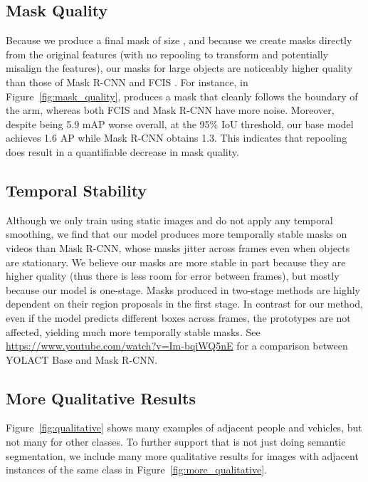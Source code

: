 \documentclass[10pt,journal,compsoc]{IEEEtran}
\begin{document}
\subsection{Mask Quality} Because we produce a final mask of size , and because we create masks directly from the original features (with no repooling to transform and potentially misalign the features), our masks for large objects are noticeably higher quality than those of Mask R-CNN \cite{maskrcnn} and FCIS \cite{fcis}. For instance, in Figure~\ref{fig:mask_quality}, \methodname{} produces a mask that cleanly follows the boundary of the arm, whereas both FCIS and Mask R-CNN have more noise. Moreover, despite being 5.9 mAP worse overall, at the 95\% IoU threshold, our base model achieves 1.6 AP while Mask R-CNN obtains 1.3. This indicates that repooling does result in a quantifiable decrease in mask quality.




\subsection{Temporal Stability}
Although we only train using static images and do not apply any temporal smoothing, we find that our model produces more temporally stable masks on videos than Mask R-CNN, whose masks jitter across frames even when objects are stationary. We believe our masks are more stable in part because they are higher quality (thus there is less room for error between frames), but mostly because our model is one-stage. Masks produced in two-stage methods are highly dependent on their region proposals in the first stage. In contrast for our method, even if the model predicts different boxes across frames, the prototypes are not affected, yielding much more temporally stable masks. See \url{https://www.youtube.com/watch?v=Im-bqiWQ5nE} for a comparison between YOLACT Base and Mask R-CNN. 











\subsection{More Qualitative Results}
    Figure~\ref{fig:qualitative} shows many examples of adjacent people and vehicles, but not many for other classes. To further support that \methodname{} is not just doing semantic segmentation, we include many more qualitative results for images with adjacent instances of the same class in Figure~\ref{fig:more_qualitative}.
    
\end{document}
